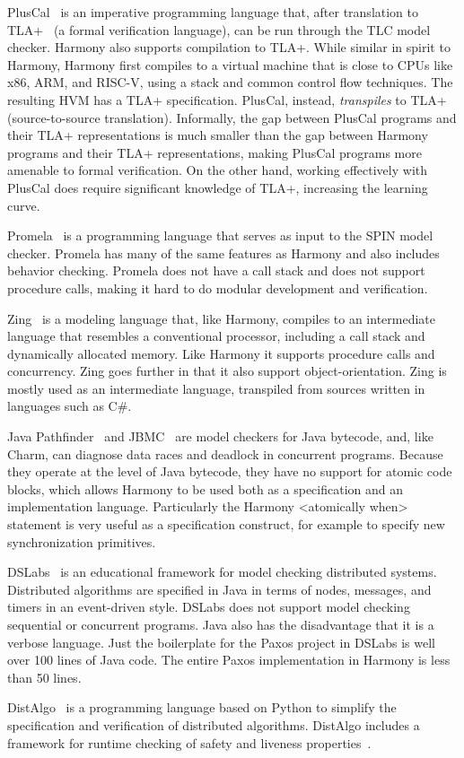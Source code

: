 \documentclass[twocolumn]{article}
\begin{document}
PlusCal~\cite{Lamport09} is an imperative programming language that,
after translation to TLA+~\cite{Lamport02} (a formal verification
language), can be run through the TLC model checker.  Harmony also
supports compilation to TLA+.  While similar in spirit to Harmony,
Harmony first compiles to a virtual machine that is close to CPUs
like x86, ARM, and RISC-V, using a stack and common control flow
techniques.  The resulting HVM has a TLA+ specification.  PlusCal,
instead, \emph{trans\-piles} to TLA+ (source-to-source translation).
Informally, the gap between PlusCal programs and their TLA+
representations is much smaller than the gap between Harmony programs
and their TLA+ representations, making PlusCal programs more amenable
to formal verification.  On the other hand, working effectively
with PlusCal does require significant knowledge of TLA+, increasing
the learning curve.

Promela~\cite{SPIN} is a programming language that serves as input
to the SPIN model checker.  Promela has many of the same features
as Harmony and also includes behavior checking.  Promela
does not have a call stack and does not support procedure calls,
making it hard to do modular development and verification.

Zing~\cite{Zing} is a modeling language that, like Harmony, compiles to an
intermediate language that resembles a conventional processor,
including a call stack and dynamically allocated memory.  Like
Harmony it supports procedure calls and concurrency.  Zing goes
further in that it also support object-orientation.  Zing is
mostly used as an intermediate language, transpiled from sources
written in languages such as C\#.

Java Pathfinder~\cite{Pathfinder} and JBMC~\cite{JBMC} are model
checkers for Java bytecode, and,
like Charm, can diagnose data races and deadlock in concurrent
programs.  Because they operate at the level of Java bytecode, they
have no support for atomic code blocks, which allows Harmony to be
used both as a specification and an implementation language.
Particularly the Harmony <{atomically when}> statement is very
useful as a specification construct, for example to specify new
synchronization primitives.

DSLabs~\cite{MWA19} is an educational framework for model checking distributed
systems.  Distributed algorithms are specified in Java in terms of
nodes, messages, and timers in an event-driven style.  DSLabs does not
support model checking sequential or concurrent programs.  Java
also has the disadvantage that it is a verbose language.  Just the
boilerplate for the Paxos project in DSLabs is well over 100 lines
of Java code.  The entire Paxos implementation in Harmony is less
than 50 lines.

Dist\-Algo~\cite{DistAlgo} is a programming language based on Python to
simplify the specification and verification of distributed algorithms.
Dist\-Algo includes a framework for runtime checking of safety and liveness
properties~\cite{LS20}.



\end{document}
